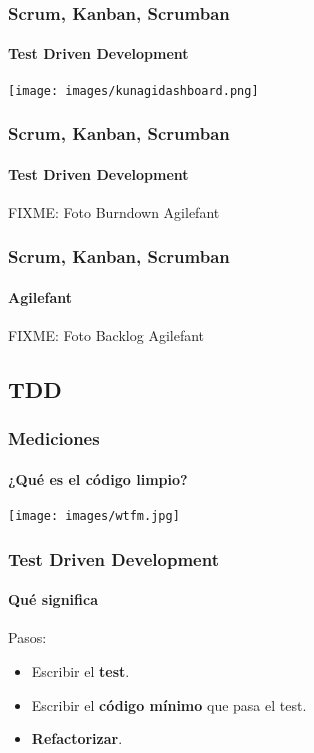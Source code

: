   \begin{frame}
   \frametitle{Scrum, Kanban, Scrumban}
   \framesubtitle{Test Driven Development}

   \begin{center}
    \texttt{[image: images/kunagidashboard.png]}
   \end{center}

  \end{frame}

  \begin{frame}
   \frametitle{Scrum, Kanban, Scrumban}
   \framesubtitle{Test Driven Development}

   FIXME: Foto Burndown Agilefant

  \end{frame}

  \begin{frame}
   \frametitle{Scrum, Kanban, Scrumban}
   \framesubtitle{Agilefant}

   FIXME: Foto Backlog Agilefant

  \end{frame}

  \subsection{TDD}

  \begin{frame}
   \frametitle{Mediciones}
   \framesubtitle{¿Qué es el código limpio?}

   \begin{center}
    \texttt{[image: images/wtfm.jpg]}
   \end{center}
  \end{frame}



  \begin{frame}
   \frametitle{Test Driven Development}
   \framesubtitle{Qué significa}

   Pasos:
   \begin{itemize}
    \item Escribir el \textbf{test}.
    \item Escribir el \textbf{código mínimo} que pasa el test.
    \item \textbf{Refactorizar}.
   \end{itemize}
  \end{frame}


